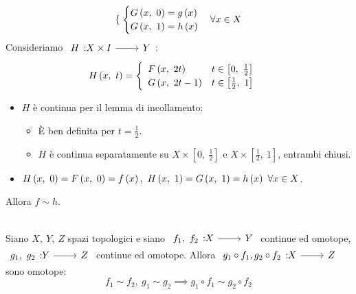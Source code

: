 \begin{demonstration}
\begin{itemize}
\begin{gather*}
\begin{cases}
	\end{cases}
	\begin{cases}
		G\left(x,\ 0\right)=g\left(x\right)\\
		G\left(x,\ 1\right)=h\left(x\right)
	\end{cases}
\forall x\in X
\end{gather*}
Consideriamo $\funz{H}{X\times I}{Y}$:
\begin{equation*}
	H\left(x,\ t\right)=\begin{cases}
		\begin{array}{lc}
			F\left(x,\ 2t\right) & t\in\left[0,\ \frac{1}{2}\right] \\
			G\left(x,\ 2t-1\right) & t\in\left[\frac{1}{2},\ 1\right]
		\end{array}	
	\end{cases}
\end{equation*}
\begin{itemize}
	\item $H$ è continua per il lemma di incollamento:
	\begin{itemize}
		\item È ben definita per $t=\frac{1}{2}$.
		\item $H$ è continua separatamente su $X\times \left[0,\ \frac{1}{2}\right]$ e $X\times \left[\frac{1}{2},\ 1\right]$, entrambi chiusi.
	\end{itemize}
\item $\mvf{H}{x}{0}=\mvf{F}{x}{0}=f\left(x\right),\ \mvf{H}{x}{1}=\mvf{G}{x}{1}=h\left(x\right)\ \forall x\in X$.
\end{itemize}
Allora $f\sim h$.
\end{itemize}
\vspace{-3mm}
\end{demonstration}
\begin{lemming}~{}\label{compomotop}\\
Siano $X,\ Y,\ Z$ spazi topologici e siano $\funz{f_1,\ f_2}{X}{Y}$ continue ed omotope, $\funz{g_1,\ g_2}{Y}{Z}$ continue ed omotope. Allora $\funz{g_1\circ f_1,  g_2\circ f_2}{X}{Z}$ sono omotope:
\begin{equation}
	f_1\sim f_2,\ g_1\sim g_2\implies g_1\circ f_1\sim g_2\circ f_2
\end{equation}
\vspace{-6mm}
\end{lemming}
